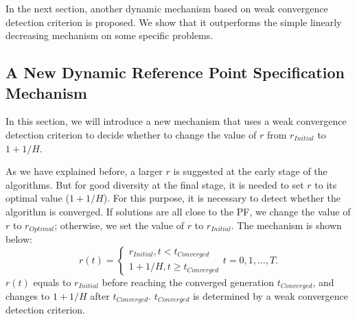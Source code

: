 \documentclass[conference]{IEEEtran}
\begin{document}
In the next section, another dynamic mechanism based on weak convergence detection criterion is proposed. 
We show that it outperforms the simple linearly decreasing mechanism on some specific problems. 

% 
\subsection{A New Dynamic Reference Point Specification Mechanism}
In this section,
we will introduce a new mechanism that uses a weak convergence detection criterion to 
decide whether to change the value of $r$ from $r_{Initial}$ to $1+1/H$. 

As we have explained before, 
a larger $r$ is suggested at the early stage of the algorithms. 
But for good diversity at the final stage,
it is needed to set $r$ to its optimal value ($1+1/H$). 
For this purpose, it is necessary to detect whether the algorithm is converged. 
If solutions are all close to the PF, 
we change the value of $r$ to $r_{Optimal}$; otherwise, we set the value of $r$ to 
$r_{Initial}$. The mechanism is shown below:
\begin{equation}\label{endm1}
  r(t)=
  \begin{cases}
    r_{Initial}, t<t_{Converged}\\
    1+1/H, t \ge t_{Converged} 
  \end{cases}
  t=0,1,\dots,T.
\end{equation}
$r(t)$ equals to $r_{Initial}$ before reaching the converged generation $t_{Converged}$, 
and changes to $1+1/H$ after $t_{Converged}$. 
$t_{Converged}$ is determined by a weak convergence detection criterion. 
\end{document}
